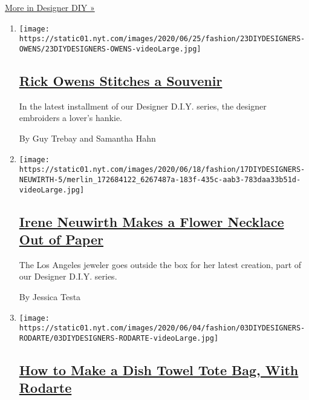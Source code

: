 \href{/issue/fashion/2020/06/19/designer-diy}{More in Designer DIY »}

\begin{enumerate}
\def\labelenumi{\arabic{enumi}.}
\item
  \texttt{[image: https://static01.nyt.com/images/2020/06/25/fashion/23DIYDESIGNERS-OWENS/23DIYDESIGNERS-OWENS-videoLarge.jpg]}

  \hypertarget{rick-owens-stitches-a-souvenir}{%
  \subsection{\texorpdfstring{\href{/2020/06/23/style/DIY-sewing-rick-owens-stitches-a-souvenir.html}{Rick
  Owens Stitches a
  Souvenir}}{Rick Owens Stitches a Souvenir}}\label{rick-owens-stitches-a-souvenir}}

  In the latest installment of our Designer D.I.Y. series, the designer
  embroiders a lover's hankie.

  By Guy Trebay and Samantha Hahn
\item
  \texttt{[image: https://static01.nyt.com/images/2020/06/18/fashion/17DIYDESIGNERS-NEUWIRTH-5/merlin\_172684122\_6267487a-183f-435c-aab3-783daa33b51d-videoLarge.jpg]}

  \hypertarget{irene-neuwirth-makes-a-flower-necklace-out-of-paper}{%
  \subsection{\texorpdfstring{\href{/2020/06/17/style/paper-flower-necklace-DIY.html}{Irene
  Neuwirth Makes a Flower Necklace Out of
  Paper}}{Irene Neuwirth Makes a Flower Necklace Out of Paper}}\label{irene-neuwirth-makes-a-flower-necklace-out-of-paper}}

  The Los Angeles jeweler goes outside the box for her latest creation,
  part of our Designer D.I.Y. series.

  By Jessica Testa
\item
  \texttt{[image: https://static01.nyt.com/images/2020/06/04/fashion/03DIYDESIGNERS-RODARTE/03DIYDESIGNERS-RODARTE-videoLarge.jpg]}

  \hypertarget{how-to-make-a-dish-towel-tote-bag-with-rodarte}{%
  \subsection{\texorpdfstring{\href{/2020/06/02/style/dish-towel-tote-bag.html}{How
  to Make a Dish Towel Tote Bag, With
  Rodarte}}{How to Make a Dish Towel Tote Bag, With Rodarte}}\label{how-to-make-a-dish-towel-tote-bag-with-rodarte}}


\end{enumerate}
